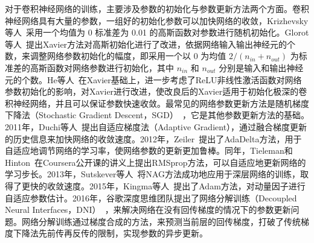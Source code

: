对于卷积神经网络的训练，主要涉及参数的初始化与参数更新方法两个方面。卷积神经网络具有大量的参数，一组好的初始化参数可以加快网络的收敛，Krizhevsky等人~\cite{krizhevsky2012imagenet}采用一个均值为 0 标准差为 0.01 的高斯函数对参数进行随机初始化。Glorot等人~\cite{glorot2010understanding}提出Xavier方法对高斯初始化进行了改进，依据网络输入输出神经元的个数，来调整网络参数初始化的幅度，即采用一个以 0 为均值 $2/(n_{in}+n_{out})$ 为标准差的高斯函数对网络参数进行初始化，其中 $n_{in}$ 和 $n_{out}$ 分别是输入和输出神经元的个数。He等人~\cite{he2015delving}在Xavier基础上，进一步考虑了ReLU非线性激活函数对网络参数初始化的影响，对Xavier进行改进，使改良后的Xavier适用于初始化极深的卷积神经网络，并且可以保证参数快速收敛。最常见的网络参数更新方法是随机梯度下降法（Stochastic Gradient Descent，SGD）~\cite{bottou2012stochastic}，它是其他参数更新方法的基础。2011年，Duchi等人~\cite{duchi2011adaptive}提出自适应梯度法（Adaptive Gradient），通过融合梯度更新的历史信息来加快网络的收敛速度。2012年，Zeiler~\cite{zeiler2012adadelta}提出了AdaDelta方法，用于自适应地调节网络的学习率，使网络参数的更新更加鲁棒。同年，Tieleman和Hinton~\cite{tieleman2012}在Coursera公开课的讲义上提出RMSprop方法，可以自适应地更新网络的学习步长。2013年，Sutskever等人~\cite{sutskever2013importance}将NAG方法成功地应用于深层网络的训练，取得了更快的收敛速度。2015年，Kingma等人~\cite{kingma2014adam}提出了Adam方法，对动量因子进行自适应参数估计。2016年，谷歌深度思维团队提出了网络分解训练（Decoupled Neural Interfaces，DNI）~\cite{jaderberg2016decoupled}，来解决网络在没有回传梯度的情况下的参数更新问题。网络分解训练通过梯度合成的方法，来预测当前层的回传梯度，打破了传统梯度下降法先前传再反传的限制，实现参数的异步更新。






